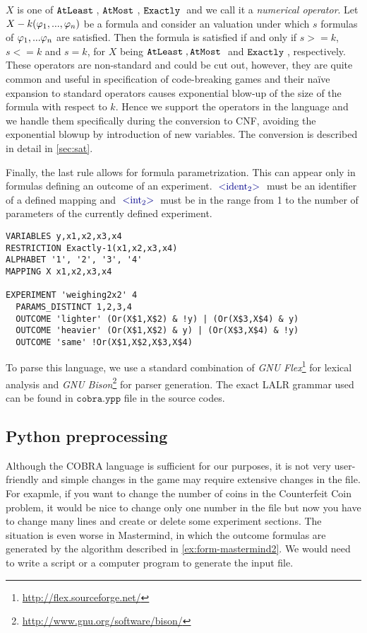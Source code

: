 $X$ is one of $\mathtt{AtLeast}_{}\:$, $\mathtt{AtMost}_{}\:$, $\mathtt{Exactly}_{}\:$ and we call it a \emph{numerical operator}.
Let $X-k(\varphi_1, ..., \varphi_n)$ be a formula and consider an valuation under which
  $s$ formulas of $\varphi_1, ...\varphi_n$ are satisfied.
Then the formula is satisfied if and only if $s>=k$, $s<=k$ and $s=k$,
  for $X$ being $\mathtt{AtLeast}_{}\:, \mathtt{AtMost}_{}\:$ and $\mathtt{Exactly}_{}\:$, respectively.
These operators are non-standard and could be cut out,
  however, they are quite common and useful in specification of code-breaking games
  and their na\"ive expansion to standard operators causes exponential
  blow-up of the size of the formula with respect to $k$.
Hence we support the operators in the language and we handle
  them specifically during the conversion to CNF,
  avoiding the exponential blowup by introduction of new variables.
The conversion is described in detail in \autoref{sec:sat}.

Finally, the last rule allows for formula parametrization.
This can appear only in formulas defining an outcome of an experiment.
$\symb{ident$_2$}$ must be an identifier of a defined mapping and
$\symb{int$_2$}$ must be in the range from 1 to the number of parameters
of the currently defined experiment.

\begin{example}
\begin{lstlisting}
VARIABLES y,x1,x2,x3,x4
RESTRICTION Exactly-1(x1,x2,x3,x4)
ALPHABET '1', '2', '3', '4'
MAPPING X x1,x2,x3,x4

EXPERIMENT 'weighing2x2' 4
  PARAMS_DISTINCT 1,2,3,4
  OUTCOME 'lighter' (Or(X$1,X$2) & !y) | (Or(X$3,X$4) & y)
  OUTCOME 'heavier' (Or(X$1,X$2) & y) | (Or(X$3,X$4) & !y)
  OUTCOME 'same' !Or(X$1,X$2,X$3,X$4)
\end{lstlisting}
\end{example}

To parse this language, we use a standard combination of
\emph{GNU Flex}\footnote{\url{http://flex.sourceforge.net/}} for lexical analysis and
\emph{GNU Bison}\footnote{\url{http://www.gnu.org/software/bison/}} for parser generation.
The exact LALR grammar used can be found in $\texttt{cobra.ypp}$ file
  in the source codes.

\subsection{Python preprocessing}

Although the COBRA language is sufficient for our purposes, it is not very user-friendly and
  simple changes in the game may require extensive changes in the file.
For exapmle, if you want to change the number of coins in the Counterfeit Coin problem,
  it would be nice to change only one number in the file
  but now you have to change many lines and create or delete some experiment sections.
The situation is even worse in Mastermind, in which the outcome formulas are
  generated by the algorithm described in \ref{ex:form-mastermind2}.
We would need to write a script or a computer program to generate the input file.

